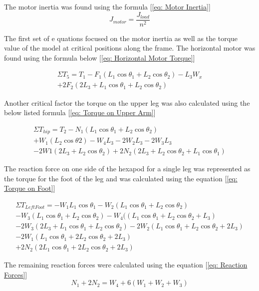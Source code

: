 The motor inertia was found using the formula  [\ref{eq: Motor Inertia}]
\begin{equation} \label{eq: Motor Inertia}
	J_{motor} = \frac{J_{load}}{n^2}
\end{equation}

	The first set of e quations focused on the motor inertia as well as the torque value of the model at critical positions along the frame. 
The horizontal motor was found using the formula below  [\ref{eq: Horizontal Motor Torque}]


\begin{multline} \label{eq: Horizontal Motor Torque}
\Sigma T_5 = T_1 - F_1 (L_1 \cos \theta_1 + L_2 \cos \theta_2) - L_3 W_x\\ + 2F_2 (2L_3 + L_1 \cos \theta_1 + L_2 \cos \theta_2)
\end{multline}

Another critical factor the torque on the upper leg was also calculated using the below listed formula [\ref{eq: Torque on Upper Arm}]

\begin{multline} \label{eq: Torque on Upper Arm}
	\Sigma T_{hip} = T_2 - N_1 (L_1 \cos \theta_1 + L_2 \cos \theta_2)\\ +
	W_1 (L_2 \cos \theta2) -W_4 L_3 -2W_2 L_3 - 2W_3 L_3\\ - 2W1 (2L_3 + L_2 \cos \theta_2)  + 	2N_2 (2L_3 + L_2 \cos \theta_2 + L_1 \cos \theta_1 )
\end{multline} 

The reaction force on one side of the hexapod for a single leg was represented as the torque for the foot of the leg and was calculated using the equation [\ref{eq: Torque on Foot}]

\begin{multline} \label{eq: Torque on Foot}
\Sigma T_{Left Foot} = -W_1 L_1 \cos \theta_1 - W_2 (L_1 \cos \theta_1 + L_2 \cos \theta_2)\\ - W_3 (L_1 \cos \theta_1 + L_2 \cos \theta_2) - W_4 ((L_1 \cos \theta_1 + L_2 \cos \theta_2 + L_3)\\ -2W_3 (2L_3 + L_1 \cos \theta_1 + L_2 \cos \theta_2)
- 2W_2 (L_1 \cos \theta_1 + L_2 \cos \theta_2 +2L_3)\\ - 2W_1 (L_1 \cos \theta_1 + 2L_2 \cos \theta_2 +2L_3)\\ + 2N_2 (2L_1 \cos \theta_1 + 2L_2 \cos \theta_2 +2L_3)
\end{multline}

The remaining reaction forces were calculated using the equation [\ref{eq: Reaction Forces}]
\begin{equation} \label{eq: Reaction Forces}
N_1+2N_2 = W_4+ 6(W_1+W_2+W_3 )
\end{equation}

